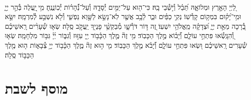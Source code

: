 \documentclass[twoside, openany, parskip=half, 11pt]{book}
\begin{document}
\begin{sometimes}

\\
%
לַ֭יְיָ הָאָ֣רֶץ וּמְלוֹאָ֑הּ תֵּ֝בֵ֗ל וְ֯י֣שְׁ֯בֵי בָֽהּ׃
כִּי־ה֖וּא עַל־יַמִּ֣ים יְ֯סָדָ֑הּ וְ֯עַל־נְ֝֯הָר֗וֹת יְ֯כֽוֹנֲנֶֽהָ׃
מִ֥י ֖יַֽעֲלֶה בְּ֯הַ֣ר יְיָ֑ וּמִ֥י־יָ֝ק֗וּם בִּמְק֥וֹם קָדְ֯שֽׁוֹ׃
נְקִ֥י כַפַּ֗יִם וּבַ֢ר לֵ֫בָ֥ב אֲשֶׁ֤ר לֹֽא־נָשָׂ֣א לַשָּׁ֣וְא נַפְשִׁ֑י וְ֯לֹ֖א נִשְׁבַּ֣ע לְ֯מִרְמָֽה׃
יִשָּׂ֣א בְ֭֯רָכָה מֵאֵ֣ת יְיָ֑ וּ֝צְדָקָ֗ה מֵֽאֱלֹהֵ֥י יִשְׁעֽוֹ׃
זֶ֭ה דּ֣וֹר דֹּרְ֯שָׁ֑ו מְ֯בַקְשֵׁ֥֨י פָנֶי֖ךָ יַֽעֲקֹ֣ב סֶֽלָה׃
שְׂא֤וּ שְׁ֯עָרִ֨ים רָֽאשֵׁיכֶ֗ם וְ֭֯הִנָּֽשְׂ֯אוּ פִּתְחֵ֣י עוֹלָ֑ם וְ֝֯יָב֗וֹא מֶ֣לֶךְ הַכָּבֽוֹד׃
מִ֥י זֶה֘ מֶ֤לֶךְ הַכָּ֫ב֥וֹד יְ֖יָ עִזּ֣וּז וְ֯גִבּ֑וֹר יְ֜יָ֗ גִּבּ֥וֹר מִלְחָמָֽה׃
שְׂא֤וּ שְׁ֯עָרִים רָֽאשֵׁיכֶ֗ם וּ֭שְׂאוּ פִּתְחֵ֣י עוֹלָ֑ם וְ֝֯יָבֹ֗א מֶ֣לֶךְ הַכָּבֽוֹד׃
מִ֤י ה֣וּא זֶה֘ מֶ֢לֶךְ הַכָּ֫ב֥וֹד יְיָ֥ צְ֯בָא֑וֹת ה֤וּא מֶ֖לֶךְ הַכָּב֣וֹד סֶֽלָה׃

\end{sometimes}



\etzchaim

\halfkaddish


\vspace{\baselineskip}


{\let\clearpage\relax
\chapter[מוסף לשבת ויו״ט]{ מוסף לשבת }}

\amidaopening{\shabbosshuva}{}

\end{document}
